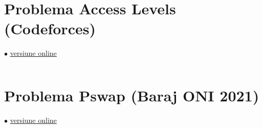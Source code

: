 \documentclass[../main.tex]{subfiles}
\begin{document}
\inputminted{cpp}{../src/graphs/brevity-is-the-soul-of-wit.cpp}


\section{Problema Access Levels (Codeforces)}
\label{code:access-levels}
$\bullet$
\href{https://codeforces.com/contest/1765/submission/254687790}{versiune online}

\inputminted{cpp}{../src/graphs/access-levels.cpp}


\section{Problema Pswap (Baraj ONI 2021)}
\label{code:pswap}
$\bullet$
\href{https://kilonova.ro/submissions/1110803}{versiune online}

\inputminted{cpp}{../src/graphs/pswap.cpp}
\end{document}
